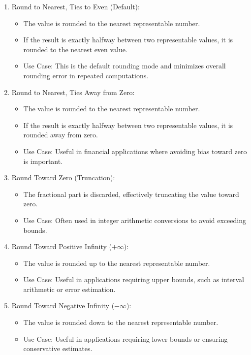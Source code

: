 \begin{enumerate}
    \item Round to Nearest, Ties to Even (Default):
    \begin{itemize}
        \item The value is rounded to the nearest representable number.
        \item If the result is exactly halfway between two representable values, it is rounded to the nearest even value.
        \item Use Case: This is the default rounding mode and minimizes overall rounding error in repeated computations.
    \end{itemize}
    
    \item Round to Nearest, Ties Away from Zero:
    \begin{itemize}
        \item The value is rounded to the nearest representable number.
        \item If the result is exactly halfway between two representable values, it is rounded away from zero.
        \item Use Case: Useful in financial applications where avoiding bias toward zero is important.
    \end{itemize}
    
    \item Round Toward Zero (Truncation):
    \begin{itemize}
        \item The fractional part is discarded, effectively truncating the value toward zero.
        \item Use Case: Often used in integer arithmetic conversions to avoid exceeding bounds.
    \end{itemize}
    
    \item Round Toward Positive Infinity (\(+\infty\)):
    \begin{itemize}
        \item The value is rounded up to the nearest representable number.
        \item Use Case: Useful in applications requiring upper bounds, such as interval arithmetic or error estimation.
    \end{itemize}
    
    \item Round Toward Negative Infinity (\(-\infty\)):
    \begin{itemize}
        \item The value is rounded down to the nearest representable number.
        \item Use Case: Useful in applications requiring lower bounds or ensuring conservative estimates.
    \end{itemize}
\end{enumerate}

